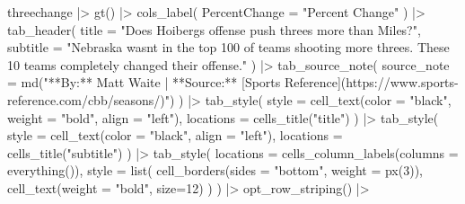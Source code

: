 \documentclass[
  letterpaper,
  DIV=11,
  numbers=noendperiod]{scrreprt}
\newenvironment{Shaded}{\begin{snugshade}}{\end{snugshade}}
\newcommand{\AttributeTok}[1]{\textcolor[rgb]{0.40,0.45,0.13}{#1}}
\newcommand{\DecValTok}[1]{\textcolor[rgb]{0.68,0.00,0.00}{#1}}
\newcommand{\FunctionTok}[1]{\textcolor[rgb]{0.28,0.35,0.67}{#1}}
\newcommand{\NormalTok}[1]{\textcolor[rgb]{0.00,0.23,0.31}{#1}}
\newcommand{\SpecialCharTok}[1]{\textcolor[rgb]{0.37,0.37,0.37}{#1}}
\newcommand{\StringTok}[1]{\textcolor[rgb]{0.13,0.47,0.30}{#1}}
\begin{document}
\begin{Shaded}
\begin{Highlighting}[]
\NormalTok{threechange }\SpecialCharTok{|\textgreater{}} 
  \FunctionTok{gt}\NormalTok{() }\SpecialCharTok{|\textgreater{}} 
  \FunctionTok{cols\_label}\NormalTok{(}
    \AttributeTok{PercentChange =} \StringTok{"Percent Change"}
\NormalTok{  ) }\SpecialCharTok{|\textgreater{}}
  \FunctionTok{tab\_header}\NormalTok{(}
    \AttributeTok{title =} \StringTok{"Does Hoiberg\textquotesingle{}s offense push threes more than Miles?"}\NormalTok{,}
    \AttributeTok{subtitle =} \StringTok{"Nebraska wasn\textquotesingle{}t in the top 100 of teams shooting more threes. These 10 teams completely changed their offense."}
\NormalTok{  ) }\SpecialCharTok{|\textgreater{}}  
  \FunctionTok{tab\_source\_note}\NormalTok{(}
    \AttributeTok{source\_note =} \FunctionTok{md}\NormalTok{(}\StringTok{"**By:** Matt Waite  |  **Source:** [Sports Reference](https://www.sports{-}reference.com/cbb/seasons/)"}\NormalTok{)}
\NormalTok{  ) }\SpecialCharTok{|\textgreater{}} 
  \FunctionTok{tab\_style}\NormalTok{(}
    \AttributeTok{style =} \FunctionTok{cell\_text}\NormalTok{(}\AttributeTok{color =} \StringTok{"black"}\NormalTok{, }\AttributeTok{weight =} \StringTok{"bold"}\NormalTok{, }\AttributeTok{align =} \StringTok{"left"}\NormalTok{),}
    \AttributeTok{locations =} \FunctionTok{cells\_title}\NormalTok{(}\StringTok{"title"}\NormalTok{)}
\NormalTok{  ) }\SpecialCharTok{|\textgreater{}} 
  \FunctionTok{tab\_style}\NormalTok{(}
    \AttributeTok{style =} \FunctionTok{cell\_text}\NormalTok{(}\AttributeTok{color =} \StringTok{"black"}\NormalTok{, }\AttributeTok{align =} \StringTok{"left"}\NormalTok{),}
    \AttributeTok{locations =} \FunctionTok{cells\_title}\NormalTok{(}\StringTok{"subtitle"}\NormalTok{)}
\NormalTok{  ) }\SpecialCharTok{|\textgreater{}}
  \FunctionTok{tab\_style}\NormalTok{(}
     \AttributeTok{locations =} \FunctionTok{cells\_column\_labels}\NormalTok{(}\AttributeTok{columns =} \FunctionTok{everything}\NormalTok{()),}
     \AttributeTok{style =} \FunctionTok{list}\NormalTok{(}
       \FunctionTok{cell\_borders}\NormalTok{(}\AttributeTok{sides =} \StringTok{"bottom"}\NormalTok{, }\AttributeTok{weight =} \FunctionTok{px}\NormalTok{(}\DecValTok{3}\NormalTok{)),}
       \FunctionTok{cell\_text}\NormalTok{(}\AttributeTok{weight =} \StringTok{"bold"}\NormalTok{, }\AttributeTok{size=}\DecValTok{12}\NormalTok{)}
\NormalTok{     )}
\NormalTok{   ) }\SpecialCharTok{|\textgreater{}}
  \FunctionTok{opt\_row\_striping}\NormalTok{() }\SpecialCharTok{|\textgreater{}} 

\end{Highlighting}
\end{Shaded}
\end{document}
